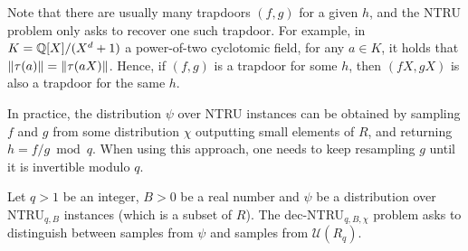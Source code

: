 Note that there are usually many trapdoors $(f,g)$ for a given $h$, and the NTRU problem only asks to recover one such trapdoor.
For example, in $K = \mathbb{Q}[X]/(X^d+1)$ a power-of-two cyclotomic field, for any $a \in K$, it holds that $\|\tau(a)\| = \|\tau(aX)\|$. Hence, if $(f,g)$ is a trapdoor for some $h$, then $(fX, gX)$ is also a trapdoor for the same $h$.

In practice, the distribution $\psi$ over NTRU instances can be obtained by sampling $f$ and $g$ from some distribution $\chi$ outputting small elements of $R$, and returning $h = f/g \bmod q$. When using this approach, one needs to keep resampling $g$ until it is invertible modulo $q$.



\begin{definition}
Let $q >1$ be an integer, $B >0$ be a real number and $\psi$ be a distribution over NTRU$_{q,B}$ instances (which is a subset of $R$). The dec-NTRU$_{q, B, \chi}$ problem asks to distinguish between samples from $\psi$ and samples from $\mathcal{U}(R_q)$.
\end{definition}


